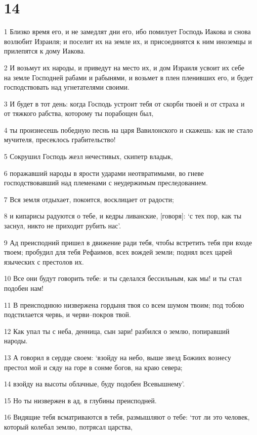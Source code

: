 \chapter{14}

\par 1 Близко время его, и не замедлят дни его, ибо помилует Господь Иакова и снова возлюбит Израиля; и поселит их на земле их, и присоединятся к ним иноземцы и прилепятся к дому Иакова.
\par 2 И возьмут их народы, и приведут на место их, и дом Израиля усвоит их себе на земле Господней рабами и рабынями, и возьмет в плен пленивших его, и будет господствовать над угнетателями своими.
\par 3 И будет в тот день: когда Господь устроит тебя от скорби твоей и от страха и от тяжкого рабства, которому ты порабощен был,
\par 4 ты произнесешь победную песнь на царя Вавилонского и скажешь: как не стало мучителя, пресеклось грабительство!
\par 5 Сокрушил Господь жезл нечестивых, скипетр владык,
\par 6 поражавший народы в ярости ударами неотвратимыми, во гневе господствовавший над племенами с неудержимым преследованием.
\par 7 Вся земля отдыхает, покоится, восклицает от радости;
\par 8 и кипарисы радуются о тебе, и кедры ливанские, [говоря]: `с тех пор, как ты заснул, никто не приходит рубить нас'.
\par 9 Ад преисподний пришел в движение ради тебя, чтобы встретить тебя при входе твоем; пробудил для тебя Рефаимов, всех вождей земли; поднял всех царей языческих с престолов их.
\par 10 Все они будут говорить тебе: и ты сделался бессильным, как мы! и ты стал подобен нам!
\par 11 В преисподнюю низвержена гордыня твоя со всем шумом твоим; под тобою подстилается червь, и черви--покров твой.
\par 12 Как упал ты с неба, денница, сын зари! разбился о землю, попиравший народы.
\par 13 А говорил в сердце своем: `взойду на небо, выше звезд Божиих вознесу престол мой и сяду на горе в сонме богов, на краю севера;
\par 14 взойду на высоты облачные, буду подобен Всевышнему'.
\par 15 Но ты низвержен в ад, в глубины преисподней.
\par 16 Видящие тебя всматриваются в тебя, размышляют о тебе: `тот ли это человек, который колебал землю, потрясал царства,
